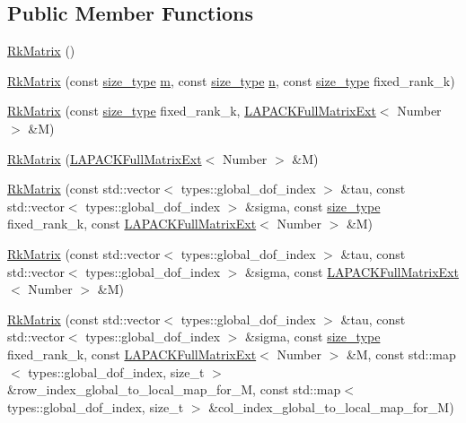 \subsection*{Public Member Functions}
\begin{DoxyCompactItemize}
\item 
\hyperlink{classRkMatrix_aa2753ce8e37595824ac275e6b26255cf}{Rk\+Matrix} ()
\item 
\hyperlink{classRkMatrix_a2ed616a9c4e1b12688a903b427260241}{Rk\+Matrix} (const \hyperlink{classRkMatrix_add060bfc3a4cc77f858c3d6dd58cadd5}{size\+\_\+type} \hyperlink{classRkMatrix_a8ca8898bcfedeee135437833f83b144c}{m}, const \hyperlink{classRkMatrix_add060bfc3a4cc77f858c3d6dd58cadd5}{size\+\_\+type} \hyperlink{classRkMatrix_a06d3b6636bb423c391c66e4ccc722687}{n}, const \hyperlink{classRkMatrix_add060bfc3a4cc77f858c3d6dd58cadd5}{size\+\_\+type} fixed\+\_\+rank\+\_\+k)
\item 
\hyperlink{classRkMatrix_a6078a6d21d37f140ff8774b8310a19eb}{Rk\+Matrix} (const \hyperlink{classRkMatrix_add060bfc3a4cc77f858c3d6dd58cadd5}{size\+\_\+type} fixed\+\_\+rank\+\_\+k, \hyperlink{classLAPACKFullMatrixExt}{L\+A\+P\+A\+C\+K\+Full\+Matrix\+Ext}$<$ Number $>$ \&M)
\item 
\hyperlink{classRkMatrix_a08ab45361d9e3cca139727dca31f9bfa}{Rk\+Matrix} (\hyperlink{classLAPACKFullMatrixExt}{L\+A\+P\+A\+C\+K\+Full\+Matrix\+Ext}$<$ Number $>$ \&M)
\item 
\hyperlink{classRkMatrix_acdd046caab506cd04e09b65bb3ffc1f9}{Rk\+Matrix} (const std\+::vector$<$ types\+::global\+\_\+dof\+\_\+index $>$ \&tau, const std\+::vector$<$ types\+::global\+\_\+dof\+\_\+index $>$ \&sigma, const \hyperlink{classRkMatrix_add060bfc3a4cc77f858c3d6dd58cadd5}{size\+\_\+type} fixed\+\_\+rank\+\_\+k, const \hyperlink{classLAPACKFullMatrixExt}{L\+A\+P\+A\+C\+K\+Full\+Matrix\+Ext}$<$ Number $>$ \&M)
\item 
\hyperlink{classRkMatrix_a4cfccf769e03141b5221c1356bd718a1}{Rk\+Matrix} (const std\+::vector$<$ types\+::global\+\_\+dof\+\_\+index $>$ \&tau, const std\+::vector$<$ types\+::global\+\_\+dof\+\_\+index $>$ \&sigma, const \hyperlink{classLAPACKFullMatrixExt}{L\+A\+P\+A\+C\+K\+Full\+Matrix\+Ext}$<$ Number $>$ \&M)
\item 
\hyperlink{classRkMatrix_adf204b7ad92834e63c7f63f6b9ca59a9}{Rk\+Matrix} (const std\+::vector$<$ types\+::global\+\_\+dof\+\_\+index $>$ \&tau, const std\+::vector$<$ types\+::global\+\_\+dof\+\_\+index $>$ \&sigma, const \hyperlink{classRkMatrix_add060bfc3a4cc77f858c3d6dd58cadd5}{size\+\_\+type} fixed\+\_\+rank\+\_\+k, const \hyperlink{classLAPACKFullMatrixExt}{L\+A\+P\+A\+C\+K\+Full\+Matrix\+Ext}$<$ Number $>$ \&M, const std\+::map$<$ types\+::global\+\_\+dof\+\_\+index, size\+\_\+t $>$ \&row\+\_\+index\+\_\+global\+\_\+to\+\_\+local\+\_\+map\+\_\+for\+\_\+M, const std\+::map$<$ types\+::global\+\_\+dof\+\_\+index, size\+\_\+t $>$ \&col\+\_\+index\+\_\+global\+\_\+to\+\_\+local\+\_\+map\+\_\+for\+\_\+M)

\end{DoxyCompactItemize}
